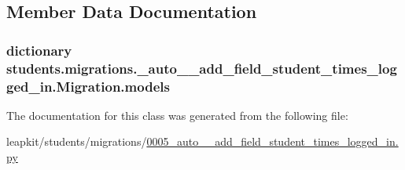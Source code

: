 \subsection{Member Data Documentation}
\hypertarget{classstudents_1_1migrations_1_10005__auto____add__field__student__times__logged__in_1_1_migration_aa96b2fe7dad0ea621ed20c777dcfdbcc}{
\subsubsection[{models}]{\setlength{\rightskip}{0pt plus 5cm}dictionary students.\-migrations.\-\_\-auto\-\_\-\-\_\-add\-\_\-field\-\_\-student\-\_\-times\-\_\-logged\-\_\-in.\-Migration.\-models\hspace{0.3cm}{\ttfamily [static]}}}\label{classstudents_1_1migrations_1_10005__auto____add__field__student__times__logged__in_1_1_migration_aa96b2fe7dad0ea621ed20c777dcfdbcc}


The documentation for this class was generated from the following file\-:\begin{DoxyCompactItemize}
\item 
leapkit/students/migrations/\hyperlink{0005__auto____add__field__student__times__logged__in_8py}{0005\-\_\-auto\-\_\-\-\_\-add\-\_\-field\-\_\-student\-\_\-times\-\_\-logged\-\_\-in.\-py}\end{DoxyCompactItemize}
